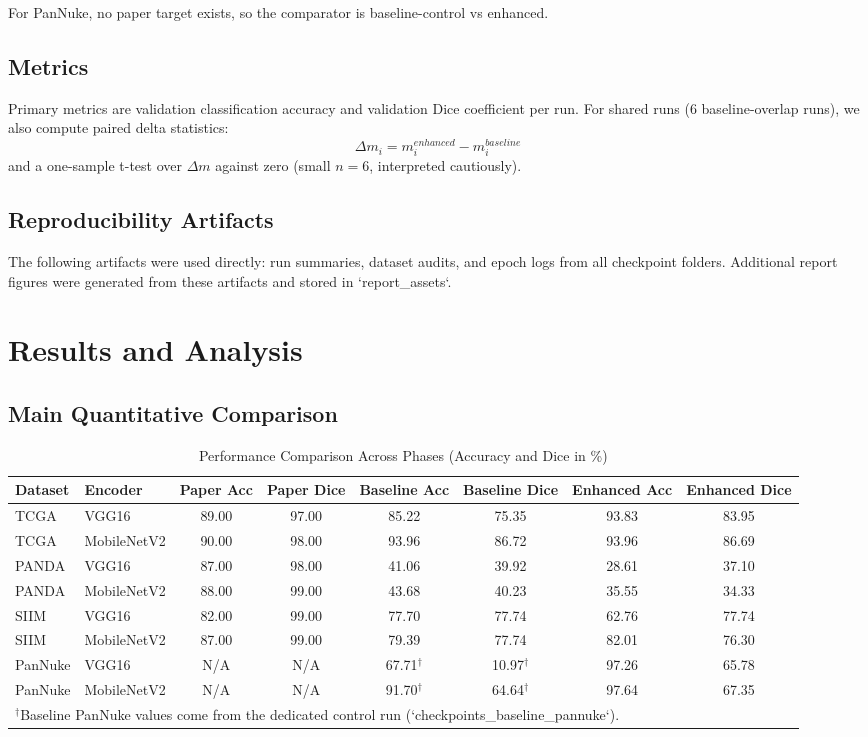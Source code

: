 \documentclass[conference]{IEEEtran}
\begin{document}
For PanNuke, no paper target exists, so the comparator is baseline-control vs enhanced.

\subsection{Metrics}
Primary metrics are validation classification accuracy and validation Dice coefficient per run. For shared runs (6 baseline-overlap runs), we also compute paired delta statistics:
\begin{equation}
\Delta m_i = m_i^{enhanced} - m_i^{baseline}
\end{equation}
and a one-sample t-test over $\Delta m$ against zero (small $n=6$, interpreted cautiously).

\subsection{Reproducibility Artifacts}
The following artifacts were used directly: run summaries, dataset audits, and epoch logs from all checkpoint folders. Additional report figures were generated from these artifacts and stored in `report\_assets`.

\section{Results and Analysis}
\subsection{Main Quantitative Comparison}
\begin{table}[t]
\caption{Performance Comparison Across Phases (Accuracy and Dice in \%)}
\label{tab:main_results}
\centering
\begin{tabular}{llcccccc}
\toprule
Dataset & Encoder & Paper Acc & Paper Dice & Baseline Acc & Baseline Dice & Enhanced Acc & Enhanced Dice \\
\midrule
TCGA & VGG16 & 89.00 & 97.00 & 85.22 & 75.35 & 93.83 & 83.95 \\
TCGA & MobileNetV2 & 90.00 & 98.00 & 93.96 & 86.72 & 93.96 & 86.69 \\
PANDA & VGG16 & 87.00 & 98.00 & 41.06 & 39.92 & 28.61 & 37.10 \\
PANDA & MobileNetV2 & 88.00 & 99.00 & 43.68 & 40.23 & 35.55 & 34.33 \\
SIIM & VGG16 & 82.00 & 99.00 & 77.70 & 77.74 & 62.76 & 77.74 \\
SIIM & MobileNetV2 & 87.00 & 99.00 & 79.39 & 77.74 & 82.01 & 76.30 \\
PanNuke & VGG16 & N/A & N/A & 67.71$^\dagger$ & 10.97$^\dagger$ & 97.26 & 65.78 \\
PanNuke & MobileNetV2 & N/A & N/A & 91.70$^\dagger$ & 64.64$^\dagger$ & 97.64 & 67.35 \\
\bottomrule
\multicolumn{8}{l}{$^\dagger$Baseline PanNuke values come from the dedicated control run (`checkpoints\_baseline\_pannuke`).}
\end{tabular}
\end{table}
\end{document}
